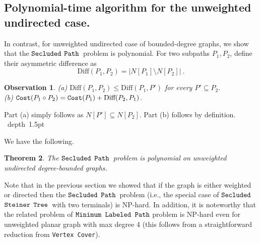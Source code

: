 \documentclass[12pt]{article}
\newtheorem{theorem}{Theorem}[section]
\newtheorem{observation}[theorem]{Observation}
\def\Cost{\mbox{\tt Cost}}
\def\Proof{\par\noindent{\bf Proof:~}}
\def\blackslug{\hbox{\hskip 1pt \vrule width 4pt height 8pt
    depth 1.5pt \hskip 1pt}}
\def\QED{\quad\blackslug\lower 8.5pt\null\par}
\newcommand{\DIFF}[0]{\mbox{Diff}}
\newcommand{\PS}[0]{$\mbox{\tt Secluded}$ $\mbox{\tt Steiner}$
$\mbox{\tt Tree}$}
\newcommand{\PP}[0]{$\mbox{\tt Secluded}$ $\mbox{\tt Path}$}
\newcommand{\MLP}[0]{\mbox{\tt Minimum Labeled Path}}
\newcommand{\VC}[0]{\mbox{\tt Vertex Cover}}
\def\Cost{\mbox{\tt Cost}}
\begin{document}
\subsection{Polynomial-time algorithm for the unweighted undirected case.}
In contrast, for unweighted undirected case of bounded-degree graphs, we show that the \PP\ problem is polynomial.
For two subpaths $P_1,P_2$, define their asymmetric difference as
\begin{equation*}
\DIFF(P_1,P_2)=|N[P_1] \setminus N[P_2]|~.
\end{equation*}
\begin{observation}
\label{obs:delta}
(a) $\DIFF(P_1,P_2) \leq \DIFF(P_1,P')$ for every $P' \subseteq P_2$.\\
(b) $\Cost(P_1 \circ P_2)= \Cost(P_1) + \DIFF(P_2,P_1)$.
\end{observation}
\Proof
Part (a) simply follows as $N[P'] \subseteq N[P_2]$. Part (b) follows by definition.
\QED
We have the following.
\begin{theorem}
\label{thm:bounded_deg_poly}
The \PP\ problem is \emph{polynomial} on unweighted undirected degree-bounded graphs.
\end{theorem}
Note that in the previous section we showed that if the graph is either weighted or directed then the \PP\ problem (i.e., the special case of \PS\ with two terminals) is NP-hard. In addition, it is noteworthy that the related problem of $\MLP$ problem \cite{YuanVJ05, HassinMS07}  is NP-hard even for unweighted planar graph with max degree 4 (this follows from a straightforward reduction from \VC).
\end{document}
